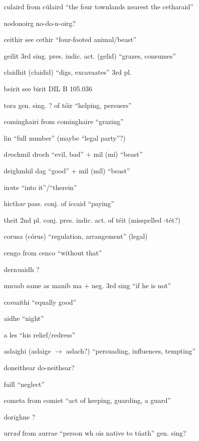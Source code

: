 \documentclass[11pt]{article}
\begin{document}
\begin{enumerate}
  \item[culaird] from c\'{u}laird \enquote{the four townlands nearest the cetharaid}
  \item[nodonoirg] no-do-n-oirg?
  \item[ceithir] see cethir \enquote{four-footed animal/beast}
  \item[geilit] 3rd sing. pres. indic. act. (gelid) \enquote{grazes, consumes}
  \item[claidhit] (claidid) \enquote{digs, excavaates} 3rd pl.
  \item[beirit] see birit DIL B 105.036
  \item[tora] gen. sing. ? of t\'{o}ir \enquote{helping, persuers}
  \item[cominghairi] from cominghaire \enquote{grazing}
  \item[lin] \enquote{full number} (maybe \enquote{legal party}?)
  \item[d\emph{r}ochmil] droch \enquote{evil, bad} + mil (m\'{i}) \enquote{beast}
  \item[deighmhil] dag \enquote{good} + mil (m\'{i}l) \enquote{beast}
  \item[in\emph{n}te] \enquote{into it}/\enquote{therein}
  \item[hicth\emph{ar}] pass. conj. of \'{i}ccaid \enquote{paying}
  \item[theit] 2nd pl. conj. pres. indic. act. of t\'{e}it (misspelled -t\'{e}t?)
  \item[corusa] (c\'{o}rus) \enquote{regulation, arrangement} (legal)
  \item[cengo] from cenco \enquote{without that}
  \item[dern\emph{n}aidh] ?
  \item[mu\emph{n}ab] same as manib ma + neg. 3rd sing \enquote{if he is not}
  \item[co\emph{m}aithi] \enquote{equally good}
  \item[aidhe] \enquote{night}
  \item[a les] \enquote{his relief/redress}
  \item[aslaighi] (aslaige $\rightarrow$ aslach?) \enquote{persuading, influences, tempting}
  \item[doneithear] do-neithear?
  \item[faill] \enquote{neglect}
  \item[cometa] from comi{e}t \enquote{act of keeping, guarding, a guard}
  \item[dorighne] ?
  \item[urr\emph{ad}] from aurrae \enquote{person wh ois native to t\'{u}ath} gen. sing? 

\end{enumerate}
\end{document}
